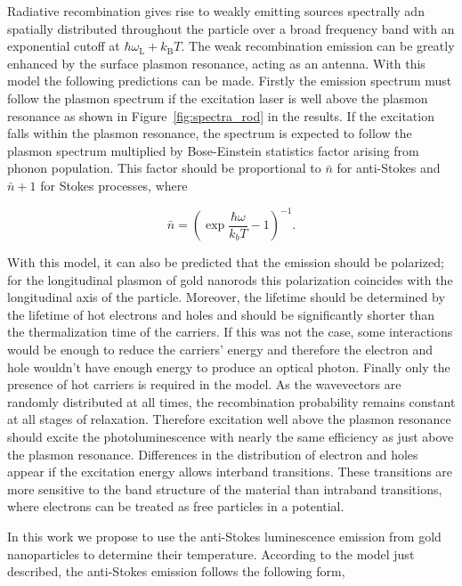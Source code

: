 Radiative recombination gives rise to weakly emitting sources spectrally adn
spatially distributed throughout the particle over a broad frequency band with
an exponential cutoff at $\hbar\omega_\textrm{L}+k_\textrm{B}T$. The weak
recombination emission can be greatly enhanced by the surface plasmon resonance,
acting as an antenna. With this model the following predictions can be made.
Firstly the emission spectrum must follow the plasmon spectrum if the excitation
laser is well above the plasmon resonance as shown in \mbox{Figure
\ref{fig:spectra_rod}} in the results. If the excitation falls within the
plasmon resonance, the spectrum is expected to follow the plasmon spectrum
multiplied by Bose-Einstein statistics factor arising from phonon population.
This factor should be proportional to $\bar{n}$ for anti-Stokes and $\bar{n}+1$
for Stokes processes, where

\begin{equation}
	\bar{n}=\left(\exp\frac{\hbar\omega}{k_bT}-1\right)^{-1}.
\end{equation}

With this model, it can also be predicted that the emission should be polarized;
for the longitudinal plasmon of gold nanorods this polarization coincides with
the longitudinal axis of the particle\cite{He2015}. Moreover, the lifetime
should be determined by the lifetime of hot electrons and holes and should be
significantly shorter than the thermalization time of the carriers. If this was
not the case, some interactions would be enough to reduce the carriers' energy
and therefore the electron and hole wouldn't have enough energy to produce an
optical photon. Finally only the presence of hot carriers is required in the
model. As the wavevectors are randomly distributed at all times, the
recombination probability remains constant at all stages of relaxation.
Therefore excitation well above the plasmon resonance should excite the
photoluminescence with nearly the same efficiency as just above the plasmon
resonance\cite{Cheng2015}. Differences in the distribution of electron and holes
appear if the excitation energy allows interband
transitions\cite{Sundararaman2014,Brown2016}. These transitions are more
sensitive to the band structure of the material than intraband transitions,
where electrons can be treated as free particles in a potential. 

In this work we propose to use the anti-Stokes luminescence emission from gold
nanoparticles to determine their temperature. According to the model just
described, the anti-Stokes emission follows the following form,

